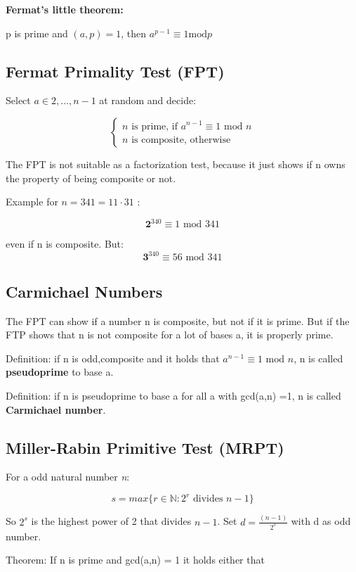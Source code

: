 \documentclass[a4paper]{article}
\begin{document}
\textbf{Fermat's little theorem:}

p is prime and $(a,p) = 1$, then $a^{p-1} \equiv 1 \text{mod}p$

\subsection{Fermat Primality Test (FPT)}

Select $a \in {2,\dots,n-1}$ at random and decide:

\[ \begin{cases} n \text{ is prime, if } a^{n-1} \equiv 1 \text{ mod } n \\ n \text{ is composite, otherwise} \end{cases} \]

The FPT is not suitable as a factorization test, because it just shows if n owns the property of being composite or not. 

Example for $n = 341 = 11 \cdot 31$ :

\[ \textbf{2}^340 \equiv 1 \text{ mod } 341 \]

even if n is composite. But:
\[ \textbf{3}^340 \equiv 56 \text{ mod } 341 \]

\subsection{Carmichael Numbers}

The FPT can show if a number n is composite, but not if it is prime. But if the FTP shows that n is not composite for a lot of bases a, it is properly prime.

Definition: if n is odd,composite and it holds that $a^{n-1} \equiv 1 \text{ mod } n$, n is called \textbf{pseudoprime} to base a.

Definition: if n is pseudoprime to base a for all a with gcd(a,n) =1, n is called \textbf{Carmichael number}.

\subsection{Miller-Rabin Primitive Test (MRPT)}

For a odd natural number \textit{n}:

\[ s = max\{r \in \mathbb{N}: 2^r \text{ divides } n-1\} \]

So $2^s$ is the highest power of 2 that divides $n-1$. Set $d=\frac{(n-1)}{2^s}$ with d as odd number.

Theorem: If n is prime and gcd(a,n) = 1 it holds either that
\end{document}
